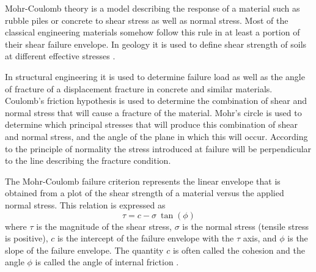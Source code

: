 Mohr-Coulomb theory is a model describing the response of a material such as rubble piles or concrete to shear stress as well as normal stress. 
Most of the classical engineering materials somehow follow this rule in at least a portion of their shear failure envelope. In geology it is used to define shear strength of soils at different effective stresses \cite{hand69}.

In structural engineering it is used to determine failure load as well as the angle of fracture of a displacement fracture in concrete and similar materials. Coulomb's friction hypothesis is used to determine the combination of shear and normal stress that will cause a fracture of the material. Mohr's circle is used to determine which principal stresses that will produce this combination of shear and normal stress, and the angle of the plane in which this will occur. According to the principle of normality the stress introduced at failure will be perpendicular to the line describing the fracture condition.


The Mohr-Coulomb failure criterion represents the linear envelope that is obtained from a plot of the shear strength of a material 
versus the applied normal stress. This relation is expressed as \cite[p219]{owhi}
\[
\tau = c- \sigma~\tan(\phi) 
\]
where $\tau$ is the magnitude of the shear stress, 
$\sigma$ is the normal stress (tensile stress is positive), 
$c$ is the intercept of the failure envelope with the $\tau$ axis, 
and $\phi$ is the slope of the failure envelope. 
The quantity $c$ is often called the cohesion and the angle $\phi$ is called the angle of internal friction . 


